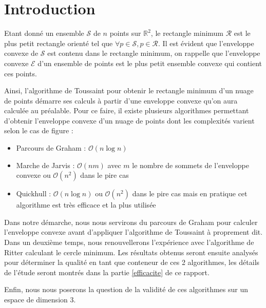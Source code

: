 \section{Introduction}
Etant donné un ensemble $\mathcal{S}$ de $n$ points sur $\mathbb R^2$, le rectangle minimum $\mathcal{R}$ est le plus petit rectangle orienté tel que $\forall p \in \mathcal{S}, p \in \mathcal{R}$. Il est évident que l'enveloppe convexe de $\mathcal{S}$ est contenu dans le rectangle minimum, on rappelle que l'enveloppe convexe $\mathcal{E}$ d'un ensemble de points  est le plus petit ensemble convexe qui contient ces points.

Ainsi, l'algorithme de Toussaint pour obtenir le rectangle minimum d'un nuage de points démarre ses calculs à partir d'une enveloppe convexe qu'on aura calculée au préalable. Pour ce faire, il existe plusieurs algorithmes permettant d'obtenir l'enveloppe convexe d'un nuage de points dont les complexités varient selon le cas de figure :
\begin{itemize}
\item Parcours de Graham : $\mathcal{O}(n\log n)$
\item Marche de Jarvis : $\mathcal{O}(nm)$ avec $m$ le nombre de sommets de l'enveloppe convexe ou $\mathcal{O}(n^2)$ dans le pire cas
\item Quickhull : $\mathcal{O}(n\log n)$ ou $\mathcal{O}(n^2)$ dans le pire cas mais en pratique cet algorithme est très efficace et la plus utilisée
\end{itemize}

Dans notre démarche, nous nous servirons du parcours de Graham pour calculer l'enveloppe convexe avant d'appliquer l'algorithme de Toussaint à proprement dit. Dans un deuxième temps, nous renouvellerons l'expérience avec l'algorithme de Ritter calculant le cercle minimum. Les résultats obtenus seront ensuite analysés pour déterminer la qualité en tant que conteneur de ces 2 algorithmes, les détails de l'étude seront montrés dans la partie \ref{efficacite} de ce rapport.

Enfin, nous nous poserons la question de la validité de ces algorithmes sur un espace de dimension 3.